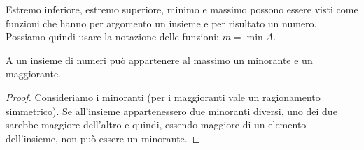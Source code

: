\begin{newoss}{}{}
Estremo inferiore, estremo superiore, minimo e massimo possono essere visti 
come funzioni che hanno per argomento un insieme e per risultato un numero.
Possiamo quindi usare la notazione delle funzioni: \quad \(m = \min{A}\).
\end{newoss}

\begin{newtheo}{}{}
A un insieme di numeri può appartenere al massimo un minorante e un 
maggiorante.
\end{newtheo}
\begin{proof}
Consideriamo i minoranti (per i maggioranti vale un ragionamento 
simmetrico).
Se all'insieme appartenessero due minoranti diversi, uno dei due sarebbe 
maggiore dell'altro e quindi, essendo maggiore di un elemento dell'insieme, 
non può essere un minorante.
\end{proof}

